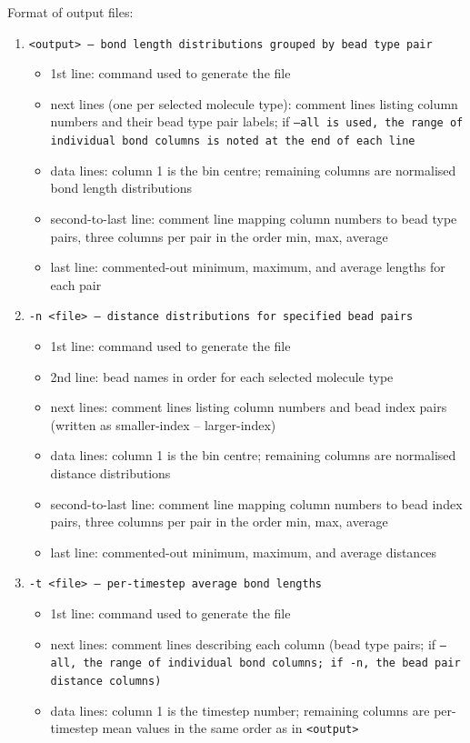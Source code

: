 \noindent
Format of output files:
\begin{enumerate}[nosep,leftmargin=20pt]
  \item \tt{<output>} --- bond length distributions grouped by bead type pair
    \begin{itemize}[nosep,leftmargin=5pt]
      \item 1st line: command used to generate the file
      \item next lines (one per selected molecule type): comment lines listing
        column numbers and their bead type pair labels; if \tt{--all} is used,
        the range of individual bond columns is noted at the end of each line
      \item data lines: column 1 is the bin centre; remaining columns are
        normalised bond length distributions
      \item second-to-last line: comment line mapping column numbers to bead
        type pairs, three columns per pair in the order min, max, average
      \item last line: commented-out minimum, maximum, and average lengths for
        each pair
    \end{itemize}
  \item \tt{-n <file>} --- distance distributions for specified bead pairs
    \begin{itemize}[nosep,leftmargin=5pt]
      \item 1st line: command used to generate the file
      \item 2nd line: bead names in order for each selected molecule type
      \item next lines: comment lines listing column numbers and bead index
        pairs (written as smaller-index -- larger-index)
      \item data lines: column 1 is the bin centre; remaining columns are
        normalised distance distributions
      \item second-to-last line: comment line mapping column numbers to bead
        index pairs, three columns per pair in the order min, max, average
      \item last line: commented-out minimum, maximum, and average distances
    \end{itemize}
  \item \tt{-t <file>} --- per-timestep average bond lengths
    \begin{itemize}[nosep,leftmargin=5pt]
      \item 1st line: command used to generate the file
      \item next lines: comment lines describing each column (bead type pairs;
        if \tt{--all}, the range of individual bond columns; if \tt{-n}, the
        bead pair distance columns)
      \item data lines: column 1 is the timestep number; remaining columns are
        per-timestep mean values in the same order as in \tt{<output>}
    \end{itemize}
\end{enumerate}
